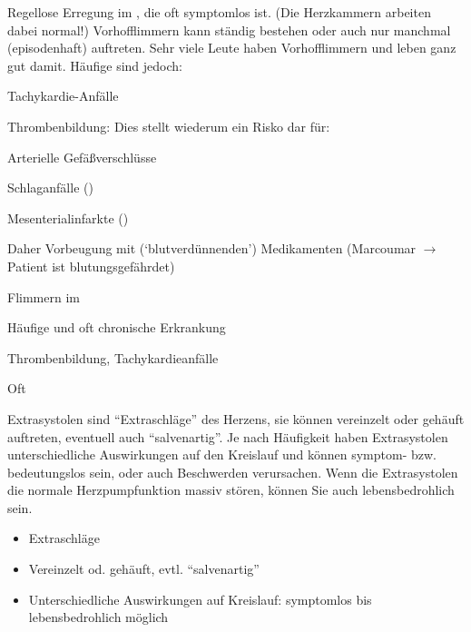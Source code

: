 {
{
\label{topic:vorhofflimmern}
Regellose Erregung im , die oft symptomlos ist. 
(Die Herzkammern arbeiten dabei normal!) Vorhofflimmern kann
ständig bestehen oder auch nur manchmal (episodenhaft)
auftreten. Sehr viele Leute haben Vorhofflimmern und leben
ganz gut damit.
Häufige  sind jedoch:
\begin{compactitem}
  \item Tachykardie-Anfälle
  \item Thrombenbildung: Dies stellt wiederum ein Risko dar für:
  \begin{compactitem}
    \item Arterielle Gefäßverschlüsse
    \item Schlaganfälle ()
    \item Mesenterialinfarkte ()
  \end{compactitem}
  Daher Vorbeugung mit 
  (\enquote*{blutverdünnenden}) Medikamenten (Marcoumar
  ${\rightarrow}$ Patient ist blutungsgefährdet)
\end{compactitem}
}
{%
\begin{compactitem}
  \item Flimmern im 
  \item Häufige und oft chronische Erkrankung
  \item Thrombenbildung, Tachykardieanfälle
  \item Oft 
\end{compactitem}

}{}{}{}



{%
\label{topic:extrasystolen}
Extrasystolen sind \enquote{Extraschläge} des Herzens, sie können
vereinzelt oder gehäuft auftreten, eventuell auch
\enquote{salvenartig}. Je nach Häufigkeit haben Extrasystolen
unterschiedliche Auswirkungen auf den Kreislauf und können
symptom- bzw. bedeutungslos sein, oder auch Beschwerden
verursachen. Wenn die Extrasystolen die normale
Herzpumpfunktion massiv stören, können Sie auch
lebensbedrohlich sein.
}
{%
\begin{itemize}
  \item Extraschläge
  \item Vereinzelt od. gehäuft, evtl. \enquote{salvenartig}
  \item Unterschiedliche Auswirkungen auf Kreislauf: symptomlos bis
  lebensbedrohlich möglich
\end{itemize}

}}
